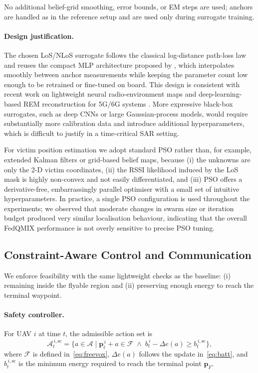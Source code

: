 \documentclass[drones,article,accept,pdftex,moreauthors]{Definitions/mdpi}
\begin{document}
No additional belief-grid smoothing, error bounds, or EM steps are used; anchors are
handled as in the reference setup and are used only during surrogate training.

\paragraph{Design justification.}
The chosen LoS/NLoS surrogate follows the classical log-distance path-loss law and
reuses the compact MLP architecture proposed by
\citet{esrafilianModelAidedDeepReinforcement2021}, which interpolates smoothly between
anchor measurements while keeping the parameter count low enough to be retrained or
fine-tuned on board. This design is consistent with recent work on lightweight neural
radio-environment maps and deep-learning-based REM reconstruction for 5G/6G systems
\citep{wenREMGraphNN2024}. More expressive black-box surrogates, such as deep CNNs or
large Gaussian-process models, would require substantially more calibration data and
introduce additional hyperparameters, which is difficult to justify in a time-critical
SAR setting.

For victim position estimation we adopt standard PSO rather than, for example,
extended Kalman filters or grid-based belief maps, because
(i) the unknowns are only the 2-D victim coordinates,
(ii) the RSSI likelihood induced by the LoS mask is highly non-convex and not easily
differentiated, and
(iii) PSO offers a derivative-free, embarrassingly parallel optimiser with a small set
of intuitive hyperparameters. In practice, a single PSO configuration is used
throughout the experiments; we observed that moderate changes in swarm size or iteration
budget produced very similar localisation behaviour, indicating that the overall
FedQMIX performance is not overly sensitive to precise PSO tuning.

\subsection{Constraint-Aware Control and Communication}\label{sec5_2}

We enforce feasibility with the same lightweight checks as the baseline:
(i) remaining inside the flyable region and
(ii) preserving enough energy to reach the terminal waypoint.

\paragraph{Safety controller.}
For UAV $i$ at time $t$, the admissible action set is
\begin{equation}
\mathcal{A}_{t}^{\,i,\mathrm{sc}}
=
\Big\{ a\in\mathcal{A} \;\big|\;
\mathbf{p}_t^{\,i}+a \in \mathcal{F}
\;\wedge\;
b_t^{\,i}-\Delta e(a) \ge b_{t}^{\,i,\mathrm{sc}}
\Big\},
\label{eq:Asafe_final}
\end{equation}
where $\mathcal{F}$ is defined in~\eqref{eq:freevox}, $\Delta e(a)$ follows the update
in~\eqref{eq:batt}, and $b_{t}^{\,i,\mathrm{sc}}$ is the minimum energy required to
reach the terminal point $\mathbf{p}_F$.
\end{document}
